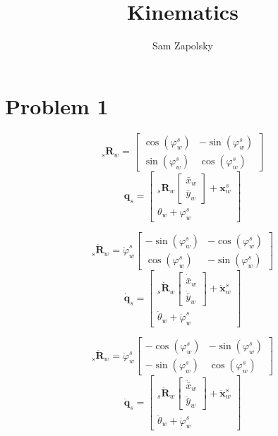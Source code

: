 \documentclass[10pt,letterpaper]{article}
\title{\textbf{Kinematics} }
\author{Sam Zapolsky}
\date{}
\providecommand{\vect}[1]{\boldsymbol#1}
\providecommand{\mat}[1]{\mathbf#1}
\begin{document}
\maketitle
	\section*{Problem 1}
	\[		
	_s\mat{R}_w = \begin{bmatrix}\cos(\varphi^s_w) &-\sin(\varphi^s_w) \\ \sin(\varphi^s_w) & \cos(\varphi^s_w)\end{bmatrix} 
	\]
	\[		
	\vect{q}_s = \begin{bmatrix} _s\mat{R}_w \begin{bmatrix} \bar{x}_w \\ \bar{y}_w \end{bmatrix} + \vect{x}^s_w \\ \theta_w + \varphi^s_w \end{bmatrix}
	\]
	
	\[		
	_s\dot{\mat{R}}_w = \dot{\varphi}^s_w\begin{bmatrix}-\sin(\varphi^s_w) &-\cos(\varphi^s_w) \\ \cos(\varphi^s_w) & -\sin(\varphi^s_w)\end{bmatrix} 
	\]
	\[		
	\dot{\vect{q}}_s = \begin{bmatrix} _s\dot{\mat{R}}_w \begin{bmatrix} \dot{\bar{x}}_w \\ \dot{\bar{y}}_w \end{bmatrix} + \dot{\vect{x}}^s_w \\ \dot{\theta}_w + \dot{\varphi}^s_w \end{bmatrix}
	\]
	
	\[		
	_s\ddot{\mat{R}}_w = \ddot{\varphi}^s_w \begin{bmatrix}-\cos(\varphi^s_w) &-\sin(\varphi^s_w) \\ -\sin(\varphi^s_w) & \cos(\varphi^s_w)\end{bmatrix} 
	\]
	\[		
	\ddot{\vect{q}}_s = \begin{bmatrix} _s\ddot{\mat{R}}_w \begin{bmatrix} \ddot{\bar{x}}_w \\ \ddot{\bar{y}}_w \end{bmatrix} + \ddot{\vect{x}}^s_w \\ \ddot{\theta}_w + \ddot{\varphi}^s_w \end{bmatrix}
	\]
\end{document}
